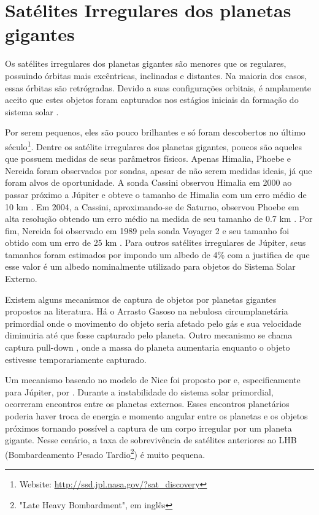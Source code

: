 \documentclass[12pt,a4paper]{monografia}
\begin{document}
\section{Satélites Irregulares dos planetas gigantes}
\label{Sec: Irr-astrometria}

\indent \indent Os satélites irregulares dos planetas gigantes são menores que os regulares, possuindo órbitas mais excêntricas, inclinadas e distantes. Na maioria dos casos, essas órbitas são retrógradas. Devido a suas configurações orbitais, é amplamente aceito que estes objetos foram capturados nos estágios iniciais da formação do sistema solar \citep{Sheppard2003}.

Por serem pequenos, eles são pouco brilhantes e só foram descobertos no último século\footnote{Website: \url{http://ssd.jpl.nasa.gov/?sat\_discovery}}. Dentre os satélite irregulares dos planetas gigantes, poucos são aqueles que possuem medidas de seus parâmetros físicos. Apenas Himalia, Phoebe e Nereida foram observados por sondas, apesar de não serem medidas ideais, já que foram alvos de oportunidade. A sonda Cassini observou Himalia em 2000 ao passar próximo a Júpiter e obteve o tamanho de Himalia com um erro médio de 10 km \citep{Porco2003}. Em 2004, a Cassini, aproximando-se de Saturno, observou Phoebe em alta resolução obtendo um erro médio na medida de seu tamanho de 0.7 km \citep{Thomas2010}. Por fim, Nereida foi observado em 1989 pela sonda Voyager 2 e seu tamanho foi obtido com um erro de 25 km \citep{Smith1989}. Para outros satélites irregulares de Júpiter, seus tamanhos foram estimados por \cite{Rettig2001} impondo um albedo de 4\% com a justifica de que esse valor é um albedo nominalmente utilizado para objetos do Sistema Solar Externo.

Existem alguns mecanismos de captura de objetos por planetas gigantes propostos na literatura. Há o Arrasto Gasoso na nebulosa circumplanetária primordial \citep{Sheppard2005} onde o movimento do objeto seria afetado pelo gás e sua velocidade diminuiria até que fosse capturado pelo planeta. Outro mecanismo se chama captura pull-down \citep{Sheppard2005}, onde a massa do planeta aumentaria enquanto o objeto estivesse temporariamente capturado.

Um mecanismo baseado no modelo de Nice \citep{Morbidelli2005, Tsiganis2005, Gomes2005} foi proposto por \cite{Nesvorny2007} e, especificamente para Júpiter, por \citealp{Nesvorny2014}. Durante a instabilidade do sistema solar primordial, ocorreram encontros entre os planetas externos. Esses encontros planetários poderia haver troca de energia e momento angular entre os planetas e os objetos próximos tornando possível a captura de um corpo irregular por um planeta gigante. Nesse cenário, a taxa de sobrevivência de satélites anteriores ao LHB (Bombardeamento Pesado Tardio\footnote{"Late Heavy Bombardment", em inglês}) é muito pequena.
\end{document}
